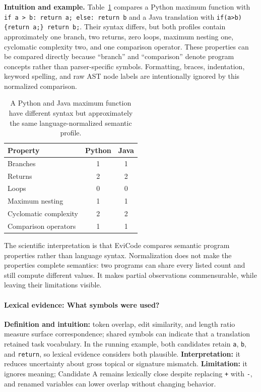 ﻿\documentclass[conference]{IEEEtran}
\begin{document}
\textbf{Intuition and example.} Table~\ref{tab:normalized-example} compares a Python maximum function with \texttt{if a > b: return a; else: return b} and a Java translation with \texttt{if(a>b)\{return a;\} return b;}. Their syntax differs, but both profiles contain approximately one branch, two returns, zero loops, maximum nesting one, cyclomatic complexity two, and one comparison operator. These properties can be compared directly because ``branch'' and ``comparison'' denote program concepts rather than parser-specific symbols. Formatting, braces, indentation, keyword spelling, and raw AST node labels are intentionally ignored by this normalized comparison.

\begin{table}[!t]
\centering
\footnotesize
\caption{A Python and Java maximum function have different syntax but approximately the same language-normalized semantic profile.}
\label{tab:normalized-example}
\begin{tabular}{@{}lcc@{}}
\toprule
Property & Python & Java \\
\midrule
Branches & 1 & 1 \\
Returns & 2 & 2 \\
Loops & 0 & 0 \\
Maximum nesting & 1 & 1 \\
Cyclomatic complexity & 2 & 2 \\
Comparison operators & 1 & 1 \\
\bottomrule
\end{tabular}
\end{table}

The scientific interpretation is that EviCode compares semantic program properties rather than language syntax. Normalization does not make the properties complete semantics: two programs can share every listed count and still compute different values. It makes partial observations commensurable, while leaving their limitations visible.

\paragraph{Lexical evidence: What symbols were used?}
\textbf{Definition and intuition:} token overlap, edit similarity, and length ratio measure surface correspondence; shared symbols can indicate that a translation retained task vocabulary. In the running example, both candidates retain \texttt{a}, \texttt{b}, and \texttt{return}, so lexical evidence considers both plausible. \textbf{Interpretation:} it reduces uncertainty about gross topical or signature mismatch. \textbf{Limitation:} it ignores meaning; Candidate A remains lexically close despite replacing \texttt{+} with \texttt{-}, and renamed variables can lower overlap without changing behavior.
\end{document}
